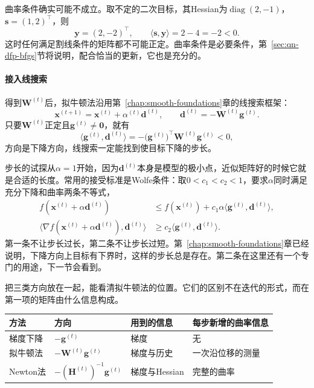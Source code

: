 曲率条件确实可能不成立。取不定的二次目标，其Hessian为$\operatorname{diag}(2,-1)$，$\bm{s}=(1,2)^\top$，则
\[
 \bm{y}=(2,-2)^\top,\qquad\langle\bm{s},\bm{y}\rangle=2-4=-2<0.
\]
这时任何满足割线条件的矩阵都不可能正定。曲率条件是必要条件，第~\ref{sec:qn-dfp-bfgs}节将说明，配合恰当的更新，它也是充分的。

\paragraph{接入线搜索}
得到$\bm{W}^{(t)}$后，拟牛顿法沿用第~\ref{chap:smooth-foundations}章的线搜索框架：
\begin{equation}
 \bm{x}^{(t+1)}=\bm{x}^{(t)}+\alpha^{(t)}\bm{d}^{(t)},\qquad\bm{d}^{(t)}=-\bm{W}^{(t)}\bm{g}^{(t)}.
 \label{eq:qn-iteration}
\end{equation}
只要$\bm{W}^{(t)}$正定且$\bm{g}^{(t)}\neq\bm{0}$，就有
\[
 \langle\bm{g}^{(t)},\bm{d}^{(t)}\rangle=-\bigl(\bm{g}^{(t)}\bigr)^\top\bm{W}^{(t)}\bm{g}^{(t)}<0,
\]
方向是下降方向，线搜索一定能找到使目标下降的步长。

步长的试探从$\alpha=1$开始，因为$\bm{d}^{(t)}$本身是模型的极小点，近似矩阵好的时候它就是合适的长度。常用的接受标准是Wolfe条件：取$0<c_1<c_2<1$，要求$\alpha$同时满足充分下降和曲率两条不等式，
\begin{equation}
 \begin{aligned}
 f(\bm{x}^{(t)}+\alpha\bm{d}^{(t)})&\leq f(\bm{x}^{(t)})+c_1\alpha\langle\bm{g}^{(t)},\bm{d}^{(t)}\rangle,\\
 \langle\nabla f(\bm{x}^{(t)}+\alpha\bm{d}^{(t)}),\bm{d}^{(t)}\rangle&\geq c_2\langle\bm{g}^{(t)},\bm{d}^{(t)}\rangle.
 \end{aligned}
 \label{eq:qn-wolfe}
\end{equation}
第一条不让步长过长，第二条不让步长过短。第~\ref{chap:smooth-foundations}章已经说明，下降方向上目标有下界时，这样的步长总是存在。第二条在这里还有一个专门的用途，下一节会看到。

把三类方向放在一起，能看清拟牛顿法的位置。它们的区别不在迭代的形式，而在第一项的矩阵由什么信息构成。

\begin{BookInlineTable}
  \centering
  \begin{tabular}{llll}
    \toprule
    方法 & 方向 & 用到的信息 & 每步新增的曲率信息\\
    \midrule
    梯度下降 & $-\bm{g}^{(t)}$ & 梯度 & 无\\
    拟牛顿法 & $-\bm{W}^{(t)}\bm{g}^{(t)}$ & 梯度与历史 & 一次沿位移的测量\\
    Newton法 & $-(\bm{H}^{(t)})^{-1}\bm{g}^{(t)}$ & 梯度与Hessian & 完整的曲率\\
    \bottomrule
  \end{tabular}
  \caption{三类方向的对比。}
  \label{tab:qn-direction-comparison}
\end{BookInlineTable}
